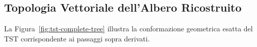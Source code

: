 \begin{table}[H]
\centering
\small
{}
\caption{Quadro riassuntivo dei passi di partizionamento ternario e delle ramificazioni ricorsive per l'insieme didattico $S = \{\text{CAT}, \text{AB}, \text{CAST}, \text{CAR}, \text{AT}\}$.}
\label{tab:tst-partition-summary}
\end{table}

\FloatBarrier
\subsection{Topologia Vettoriale dell'Albero Ricostruito}
\label{subsec:topologia-tst-albero}

La Figura~\ref{fig:tst-complete-tree} illustra la conformazione geometrica esatta del TST corrispondente ai passaggi sopra derivati.


